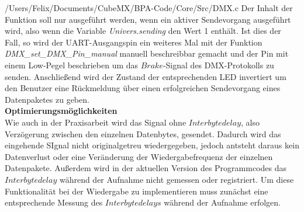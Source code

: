 
{/Users/Felix/Documents/CubeMX/BPA-Code/Core/Src/DMX.c}
Der Inhalt der Funktion soll nur ausgeführt werden, wenn ein aktiver Sendevorgang ausgeführt wird, also wenn die Variable \textit{Univers.sending} den Wert 1 enthält. Ist dies der Fall, so wird der UART-Ausgangspin ein weiteres Mal mit der Funktion \textit{DMX\_set\_DMX\_Pin\_manual} manuell beschreibbar gemacht und der Pin mit einem Low-Pegel beschrieben um das $Brake$-Signal des DMX-Protokolls zu senden. Anschließend wird der Zustand der entsprechenden LED invertiert um den Benutzer eine Rückmeldung über einen erfolgreichen Sendevorgang eines Datenpaketes zu geben.\\
\textbf{Optimierungsmöglichkeiten}\\
Wie auch in der Praxisarbeit wird das Signal ohne $Interbytedelay$, also Verzögerung zwischen den einzelnen Datenbytes, gesendet. Dadurch wird das eingehende SIgnal nicht originalgetreu wiedergegeben, jedoch antsteht daraus kein Datenverlust oder eine Veränderung der Wiedergabefrequenz der einzelnen Datenpakete. Außerdem wird in der aktuellen Version des Programmcodes das $Interbytedelay$ während der Aufnahme nicht gemessen oder registriert. Um diese Funktionalität bei der Wiedergabe zu implementieren muss zunächst eine entsprechende Messung des $Interbytedelays$ während der Aufnahme erfolgen.